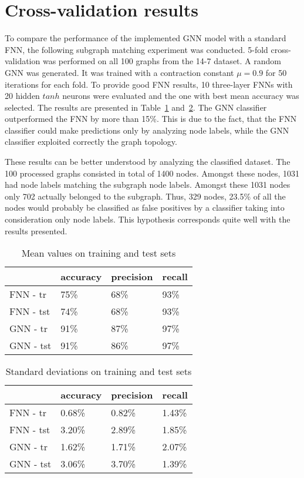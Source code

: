 \section{Cross-validation results}
To compare the performance of the implemented GNN model with a standard FNN, the following subgraph matching experiment was conducted. 5-fold cross-validation was performed on all 100 graphs from the 14-7 dataset. A random GNN was generated. It was trained with a contraction constant $\mu = 0.9$ for 50 iterations for each fold. To provide good FNN results, 10 three-layer FNNs with 20 hidden $tanh$ neurons were evaluated and the one with best mean accuracy was selected. The results are presented in Table~\ref{tab:crossmean} and~\ref{tab:crossstd}. The GNN classifier outperformed the FNN by more than 15\%. This is due to the fact, that the FNN classifier could make predictions only by analyzing node labels, while the GNN classifier exploited correctly the graph topology.

These results can be better understood by analyzing the classified dataset. The 100 processed graphs consisted in total of 1400 nodes. Amongst these nodes, 1031 had node labels matching the subgraph node labels. Amongst these 1031 nodes only 702 actually belonged to the subgraph. Thus, 329 nodes, 23.5\% of all the nodes would probably be classified as false positives by a classifier taking into consideration only node labels. This hypothesis corresponds quite well with the results presented.

\begin{table}[h!]
	\begin{center}
	\begin{tabular}{llll}
	\toprule
	& accuracy & precision & recall \\
	\midrule
	FNN - tr &	75\% &  68\% &  93\% \\
	FNN - tst &	74\% &  68\% &  93\% \\
	GNN - tr &	91\% &  87\% &  97\% \\
	GNN - tst &	91\% &  86\% &  97\% \\
	\bottomrule
	\end{tabular}
	\caption{Mean values on training and test sets}
	\label{tab:crossmean}
	\end{center}
\end{table}

\begin{table}[h!]
	\begin{center}
	\begin{tabular}{llll}
	\toprule
	& accuracy & precision & recall \\
	\midrule
	FNN - tr &	0.68\% &  0.82\% &  1.43\% \\
	FNN - tst &	3.20\% &  2.89\% &  1.85\% \\
	GNN - tr &	1.62\% &  1.71\% &  2.07\% \\
	GNN - tst &	3.06\% &  3.70\% &  1.39\% \\
	\bottomrule
	\end{tabular}
	\caption{Standard deviations on training and test sets}
	\label{tab:crossstd}
	\end{center}
\end{table}
